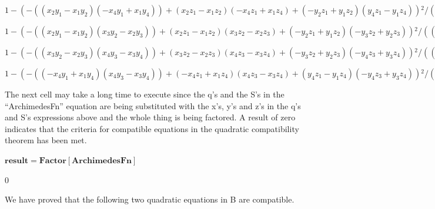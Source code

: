 \documentclass{article}
\begin{document}
\begin{doublespace}
\noindent\(1-\left(-\left(\left(x_2 y_1-x_1 y_2\right) \left(-x_4 y_1+x_1 y_4\right)\right)+\left(x_2 z_1-x_1 z_2\right) \left(-x_4 z_1+x_1 z_4\right)+\left(-y_2
z_1+y_1 z_2\right) \left(y_4 z_1-y_1 z_4\right)\right){}^2/\left(\left(-\left(x_2 y_1-x_1 y_2\right){}^2+\left(x_2 z_1-x_1 z_2\right){}^2+\left(-y_2
z_1+y_1 z_2\right){}^2\right) \left(-\left(-x_4 y_1+x_1 y_4\right){}^2+\left(-x_4 z_1+x_1 z_4\right){}^2+\left(y_4 z_1-y_1 z_4\right){}^2\right)\right)\)
\end{doublespace}

\begin{doublespace}
\noindent\(1-\left(-\left(\left(x_2 y_1-x_1 y_2\right) \left(x_3 y_2-x_2 y_3\right)\right)+\left(x_2 z_1-x_1 z_2\right) \left(x_3 z_2-x_2 z_3\right)+\left(-y_2
z_1+y_1 z_2\right) \left(-y_3 z_2+y_2 z_3\right)\right){}^2/\left(\left(-\left(x_2 y_1-x_1 y_2\right){}^2+\left(x_2 z_1-x_1 z_2\right){}^2+\left(-y_2
z_1+y_1 z_2\right){}^2\right) \left(-\left(x_3 y_2-x_2 y_3\right){}^2+\left(x_3 z_2-x_2 z_3\right){}^2+\left(-y_3 z_2+y_2 z_3\right){}^2\right)\right)\)
\end{doublespace}

\begin{doublespace}
\noindent\(1-\left(-\left(\left(x_3 y_2-x_2 y_3\right) \left(x_4 y_3-x_3 y_4\right)\right)+\left(x_3 z_2-x_2 z_3\right) \left(x_4 z_3-x_3 z_4\right)+\left(-y_3
z_2+y_2 z_3\right) \left(-y_4 z_3+y_3 z_4\right)\right){}^2/\left(\left(-\left(x_3 y_2-x_2 y_3\right){}^2+\left(x_3 z_2-x_2 z_3\right){}^2+\left(-y_3
z_2+y_2 z_3\right){}^2\right) \left(-\left(x_4 y_3-x_3 y_4\right){}^2+\left(x_4 z_3-x_3 z_4\right){}^2+\left(-y_4 z_3+y_3 z_4\right){}^2\right)\right)\)
\end{doublespace}

\begin{doublespace}
\noindent\(1-\left(-\left(\left(-x_4 y_1+x_1 y_4\right) \left(x_4 y_3-x_3 y_4\right)\right)+\left(-x_4 z_1+x_1 z_4\right) \left(x_4 z_3-x_3 z_4\right)+\left(y_4
z_1-y_1 z_4\right) \left(-y_4 z_3+y_3 z_4\right)\right){}^2/\left(\left(-\left(-x_4 y_1+x_1 y_4\right){}^2+\left(-x_4 z_1+x_1 z_4\right){}^2+\left(y_4
z_1-y_1 z_4\right){}^2\right) \left(-\left(x_4 y_3-x_3 y_4\right){}^2+\left(x_4 z_3-x_3 z_4\right){}^2+\left(-y_4 z_3+y_3 z_4\right){}^2\right)\right)\)
\end{doublespace}

The next cell may take a long time to execute since the q{'}s and the S{'}s in the {``}ArchimedesFn{''} equation are being substituted with the x{'}s,
y{'}s and z{'}s in the q{'}s and S{'}s expressions above and the whole thing is being factored. A result of zero indicates that the criteria for
compatible equations in the quadratic compatibility theorem has been met.

\begin{doublespace}
\noindent\(\pmb{\text{result} = \text{Factor}[\text{ArchimedesFn} ]}\)
\end{doublespace}

\begin{doublespace}
\noindent\(0\)
\end{doublespace}

We have proved that the following two quadratic equations in B are compatible.
\end{document}
